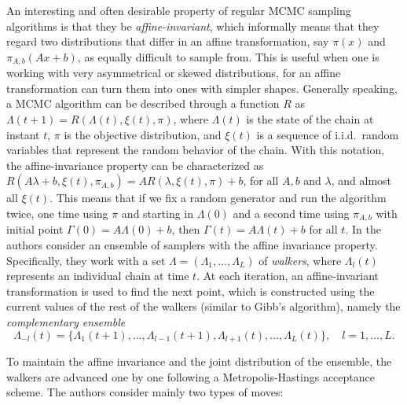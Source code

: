 An interesting and often desirable property of regular MCMC sampling algorithms is that they be \textit{affine-invariant}, which informally means that they regard two distributions that differ in an affine transformation, say \(\pi(x)\) and \(\pi_{A, b}(Ax + b)\), as equally difficult to sample from. This is useful when one is working with very asymmetrical or skewed distributions, for an affine transformation can turn them into ones with simpler shapes. Generally speaking, a MCMC algorithm can be described through a function \(R\) as \(\Lambda(t+1)=R(\Lambda(t), \xi(t), \pi)\), where \(\Lambda(t)\) is the state of the chain at instant \(t\), \(\pi\) is the objective distribution, and \(\xi(t)\) is a sequence of i.i.d.\ random variables that represent the random behavior of the chain. With this notation, the affine-invariance property can be characterized as \(R(A\lambda+b, \xi(t), \pi_{A,b}) = AR(\lambda, \xi(t), \pi) + b\), for all \(A,b\) and \(\lambda\), and almost all \(\xi(t)\). This means that if we fix a random generator and run the algorithm twice, one time using \(\pi\) and starting in \(\Lambda(0)\) and a second time using \(\pi_{A,b}\) with initial point \(\Gamma(0)=A\Lambda(0)+b\), then \(\Gamma(t)=A\Lambda(t)+b\) for all \(t\). In \citet{goodman2010ensemble} the authors consider an ensemble of samplers with the affine invariance property. Specifically, they work with a set \(\Lambda=(\Lambda_1, \dots, \Lambda_L)\) of \textit{walkers}, where \(\Lambda_l(t)\) represents an individual chain at time \(t\). At each iteration, an affine-invariant transformation is used to find the next point, which is constructed using the current values of the rest of the walkers (similar to Gibb's algorithm), namely the \textit{complementary ensemble}
\[
  \Lambda_{-l}(t) = \{\Lambda_1(t+1), \dots, \Lambda_{l-1}(t+1), \Lambda_{l+1}(t), \dots, \Lambda_L(t)\}, \quad l=1,\dots, L.
\]

To maintain the affine invariance and the joint distribution of the ensemble, the walkers are advanced one by one following a Metropolis-Hastings acceptance scheme. The authors consider mainly two types of moves:

